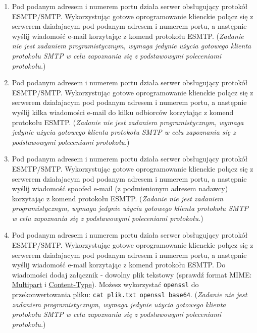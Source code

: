 \documentclass{article}
\begin{document}
\begin{enumerate}[label=\textbf{6.\arabic*}]\setlength{\itemsep}{1em}

\item Pod podanym adresem i numerem portu działa serwer obsługujący protokół ESMTP/SMTP. Wykorzystując gotowe oprogramowanie klienckie połącz się z serwerem działajacym pod podanym adresem i numerem portu, a następnie wyślij wiadomość e-mail korzytając z komend protokołu ESMTP.  (\textit{Zadanie nie jest zadaniem programistycznym, wymaga jedynie użycia gotowego klienta protokołu SMTP w celu zapoznania się z podstawowymi poleceniami protokołu.})

\item Pod podanym adresem i numerem portu działa serwer obsługujący protokół ESMTP/SMTP. Wykorzystując gotowe oprogramowanie klienckie połącz się z serwerem działajacym pod podanym adresem i numerem portu, a następnie wyślij kilka wiadomości e-mail do kilku odbiorców korzytając z komend protokołu ESMTP.  (\textit{Zadanie nie jest zadaniem programistycznym, wymaga jedynie użycia gotowego klienta protokołu SMTP w celu zapoznania się z podstawowymi poleceniami protokołu.})

\item Pod podanym adresem i numerem portu działa serwer obsługujący protokół ESMTP/SMTP. Wykorzystując gotowe oprogramowanie klienckie połącz się z serwerem działajacym pod podanym adresem i numerem portu, a następnie wyślij wiadomość spoofed e-mail (z podmienionym adresem nadawcy) korzytając z komend protokołu ESMTP.  (\textit{Zadanie nie jest zadaniem programistycznym, wymaga jedynie użycia gotowego klienta protokołu SMTP w celu zapoznania się z podstawowymi poleceniami protokołu.})

\item Pod podanym adresem i numerem portu działa serwer obsługujący protokół ESMTP/SMTP. Wykorzystując gotowe oprogramowanie klienckie połącz się z serwerem działajacym pod podanym adresem i numerem portu, a następnie wyślij wiadomość e-mail korzytając z komend protokołu ESMTP.  Do wiadomości dodaj załącznik - dowolny plik tekstowy (sprawdź format MIME: \href{https://www.w3.org/Protocols/rfc1341/7_2_Multipart.html}{Multipart} i \href{https://www.w3.org/Protocols/rfc1341/7_3_Message.html}{Content-Type}).  Możesz wykorzystać \texttt{openssl} do przekonwertowania pliku: \texttt{cat plik.txt \textbar  openssl base64}.  (\textit{Zadanie nie jest zadaniem programistycznym, wymaga jedynie użycia gotowego klienta protokołu SMTP w celu zapoznania się z podstawowymi poleceniami protokołu.})


\end{enumerate}
\end{document}

